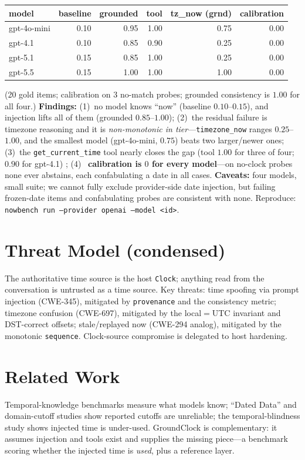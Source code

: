 \documentclass[11pt]{article}
\begin{document}
\begin{center}
\begin{tabular}{lrrrrr}
\toprule
model & baseline & grounded & tool & tz\_now (grnd) & calibration \\
\midrule
gpt-4o-mini & 0.10 & 0.95 & 1.00 & 0.75 & 0.00 \\
gpt-4.1 & 0.10 & 0.85 & 0.90 & 0.25 & 0.00 \\
gpt-5.1 & 0.15 & 0.85 & 1.00 & 0.25 & 0.00 \\
gpt-5.5 & 0.15 & 1.00 & 1.00 & 1.00 & 0.00 \\
\bottomrule
\end{tabular}
\end{center}

\noindent (20 gold items; calibration on 3 no-match probes; grounded consistency is $1.00$ for all
four.) \textbf{Findings:} (1)~no model knows ``now'' (baseline $0.10$--$0.15$), and injection lifts
all of them (grounded $0.85$--$1.00$); (2)~the residual failure is timezone reasoning and it is
\emph{non-monotonic in tier}---\texttt{timezone\_now} ranges $0.25$--$1.00$, and the smallest model
(gpt-4o-mini, $0.75$) beats two larger/newer ones; (3)~the \texttt{get\_current\_time} tool nearly
closes the gap (tool $1.00$ for three of four; $0.90$ for gpt-4.1) \cite{span2025}; (4)~\textbf{
calibration is $0$ for every model}---on no-clock probes none ever abstains, each confabulating a
date in all cases. \textbf{Caveats:} four models, small suite; we cannot fully exclude provider-side
date injection, but failing frozen-date items and confabulating probes are consistent with none.
Reproduce: \texttt{nowbench run --provider openai --model <id>}.

\section{Threat Model (condensed)}
The authoritative time source is the host \texttt{Clock}; anything read from the conversation is
untrusted as a time source. Key threats: time spoofing via prompt injection (CWE-345), mitigated by
\texttt{provenance} and the consistency metric; timezone confusion (CWE-697), mitigated by the
local$=$UTC invariant and DST-correct offsets; stale/replayed now (CWE-294 analog), mitigated by the
monotonic \texttt{sequence}. Clock-source compromise is delegated to host hardening.

\section{Related Work}
Temporal-knowledge benchmarks \cite{chen2021timeqa,tan2023tempreason,span2025} measure
what models know; ``Dated Data'' \cite{cheng2024dated} and domain-cutoff studies
\cite{shah2025cutoff} show reported cutoffs are unreliable; the temporal-blindness study
\cite{blindness2025} shows injected time is under-used.
GroundClock is complementary: it assumes injection and tools exist and supplies the missing
piece---a benchmark scoring whether the injected time is \emph{used}, plus a reference layer.
\end{document}

